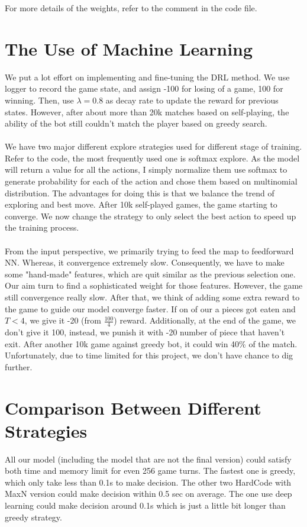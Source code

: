 \documentclass[11pt]{article}
\begin{document}
For more details of the weights, refer to the comment in the code file.

\section{The Use of Machine Learning}
We put a lot effort on implementing and fine-tuning the DRL method. We use logger to 
record the game state, and assign -100 for losing of a game, 100 for winning. Then, use $\lambda=0.8$ as decay rate
to update the reward for previous states.
However, after about more than 20k matches based on self-playing, the ability of the bot still couldn't 
match the player based on greedy search.
\\
\\
We have two major different explore strategies used for different stage of training. 
Refer to the code, the most frequently used one 
is softmax explore. As the model will return a value for all the actions, I simply normalize them use
softmax to generate probability for each of the action and chose them based on multinomial distribution. 
The advantages for doing this is that we balance the trend of exploring and best move. After 10k self-played
games, the game starting to converge. We now change the strategy to only select the best action to speed up 
the training process.
\\
\\
From the input perspective, we primarily trying to feed the map to feedforward NN. Whereas, 
it convergence extremely slow. Consequently, we have to
make some "hand-made" features, which are quit similar as the previous selection one. Our aim turn to find a 
sophisticated weight for those features. However, the game still convergence really slow. After that, we think of adding
some extra reward to the game to guide our model converge faster. If on of our a pieces got eaten and $T < 4$, we give it
-20 (from $\frac{100}{4}$) reward. Additionally, at the end of the game, we don't give it 100, instead, we punish it 
with -20 \* number of piece that haven't exit. After another 10k game against greedy bot, it could win 40\% of the match.
Unfortunately, due to time limited for this project, we don't have chance to dig further.

\section{Comparison Between Different Strategies}

All our model (including the model that are not the final version) could satisfy both
time and memory limit for even 256 game turns. The fastest one is greedy, 
which only take less than 0.1s to make decision. 
The other two HardCode with MaxN version could make decision within 0.5 sec on average.
The one use deep learning could make decision around 0.1s which is just a little bit longer than greedy strategy.
\end{document}
